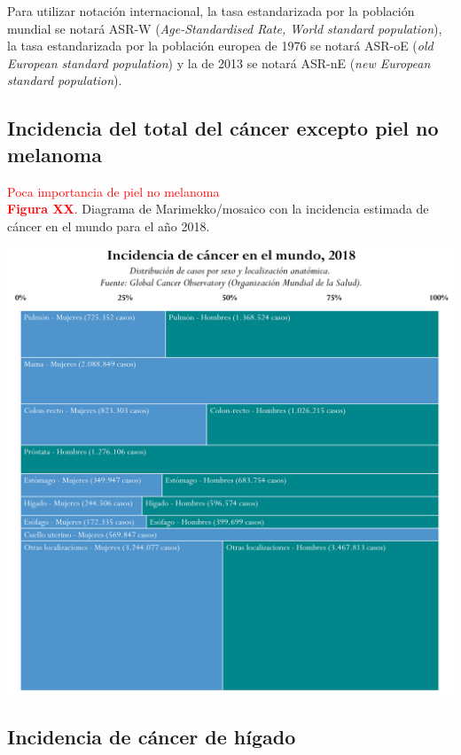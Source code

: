Para utilizar notación internacional, la tasa estandarizada por la población mundial se notará ASR-W (\textit{Age-Standardised Rate, World standard population}), la tasa estandarizada por la población europea de 1976 se notará ASR-oE (\textit{old European standard population}) y la de 2013 se notará ASR-nE (\textit{new European standard population}).\\

\subsection{Incidencia del total del cáncer excepto piel no melanoma}

\textcolor{red}{Poca importancia de piel no melanoma}\\

\newpage
\textbf{\textcolor{red}{Figura XX}}. Diagrama de Marimekko/mosaico con la incidencia estimada de cáncer en el mundo para el año 2018.
\begin{center}
	\includegraphics[width=1\textwidth]{figuras/marimekko_gco.png} \\
\end{center}


\subsection{Incidencia de cáncer de hígado}

